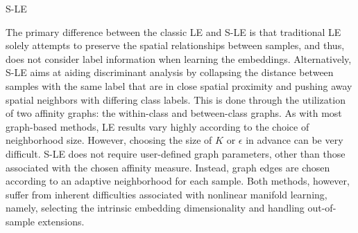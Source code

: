\begin{algorithm}[h!]
	\caption{S-LE}
	\label{alg:SLE}
	\begin{algorithmic}[1]
		\Else
		\EndIf
		\EndFor
	\end{algorithmic}
\end{algorithm}

The primary difference between the classic LE and S-LE is that traditional LE solely attempts to preserve the spatial relationships between samples, and thus, does not consider label information when learning the embeddings.  Alternatively, S-LE aims at aiding discriminant analysis by collapsing the distance between samples with the same label that are in close spatial proximity and pushing away spatial neighbors with differing class labels.  This is done through the utilization of two affinity graphs: the within-class and between-class graphs.  As with most graph-based methods, LE results vary highly according to the choice of neighborhood size.  However, choosing the size of $K$ or $\epsilon$ in advance can be very difficult. S-LE does not require user-defined graph parameters, other than those associated with the chosen affinity measure.  Instead, graph edges are chosen according to an adaptive neighborhood for each sample.   Both methods, however, suffer from inherent difficulties associated with nonlinear manifold learning, namely, selecting the intrinsic embedding dimensionality and handling out-of-sample extensions.

